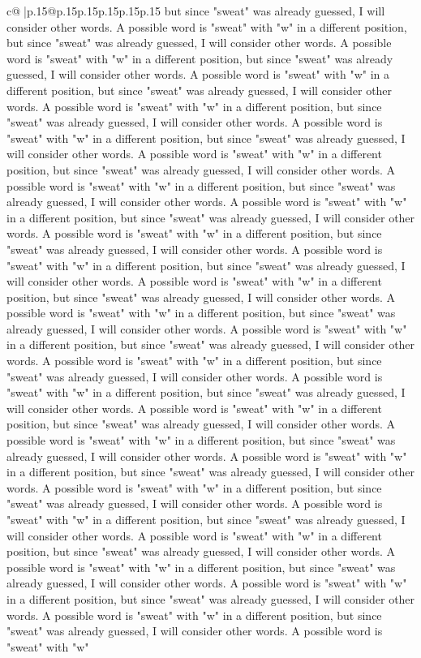 \documentclass{article}
\begin{document}
{\begin{supertabular}{c@{$\;$}|p{.15\linewidth}@{}p{.15\linewidth}p{.15\linewidth}p{.15\linewidth}p{.15\linewidth}p{.15\linewidth}}
{{{but since "sweat" was already guessed, I will consider other words. A possible word is "sweat" with "w" in a different position, but since "sweat" was already guessed, I will consider other words. A possible word is "sweat" with "w" in a different position, but since "sweat" was already guessed, I will consider other words. A possible word is "sweat" with "w" in a different position, but since "sweat" was already guessed, I will consider other words. A possible word is "sweat" with "w" in a different position, but since "sweat" was already guessed, I will consider other words. A possible word is "sweat" with "w" in a different position, but since "sweat" was already guessed, I will consider other words. A possible word is "sweat" with "w" in a different position, but since "sweat" was already guessed, I will consider other words. A possible word is "sweat" with "w" in a different position, but since "sweat" was already guessed, I will consider other words. A possible word is "sweat" with "w" in a different position, but since "sweat" was already guessed, I will consider other words. A possible word is "sweat" with "w" in a different position, but since "sweat" was already guessed, I will consider other words. A possible word is "sweat" with "w" in a different position, but since "sweat" was already guessed, I will consider other words. A possible word is "sweat" with "w" in a different position, but since "sweat" was already guessed, I will consider other words. A possible word is "sweat" with "w" in a different position, but since "sweat" was already guessed, I will consider other words. A possible word is "sweat" with "w" in a different position, but since "sweat" was already guessed, I will consider other words. A possible word is "sweat" with "w" in a different position, but since "sweat" was already guessed, I will consider other words. A possible word is "sweat" with "w" in a different position, but since "sweat" was already guessed, I will consider other words. A possible word is "sweat" with "w" in a different position, but since "sweat" was already guessed, I will consider other words. A possible word is "sweat" with "w" in a different position, but since "sweat" was already guessed, I will consider other words. A possible word is "sweat" with "w" in a different position, but since "sweat" was already guessed, I will consider other words. A possible word is "sweat" with "w" in a different position, but since "sweat" was already guessed, I will consider other words. A possible word is "sweat" with "w" in a different position, but since "sweat" was already guessed, I will consider other words. A possible word is "sweat" with "w" in a different position, but since "sweat" was already guessed, I will consider other words. A possible word is "sweat" with "w" in a different position, but since "sweat" was already guessed, I will consider other words. A possible word is "sweat" with "w" in a different position, but since "sweat" was already guessed, I will consider other words. A possible word is "sweat" with "w" in a different position, but since "sweat" was already guessed, I will consider other words. A possible word is "sweat" with "w" }}}
\end{supertabular}}
\end{document}
